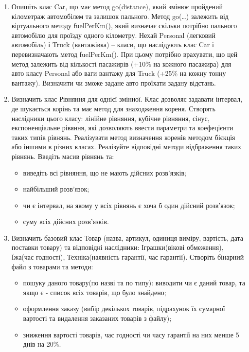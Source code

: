 \documentclass[a5paper,titlepage,openany,twoside,draft]{book_unv}%
\begin{document}
\begin{enumerate}
\item
  Опишіть клас Car, що має метод go(distance), який змінює пройдений
  кілометраж автомобілем та залишок пального. Метод go(\ldots{})
  залежить від віртуального методу fuelPerKm(), який визначає скільки
  потрібно пального автомобілю для проїзду одного кілометру. Нехай
  Personal (легковий автомобіль) і Truck (вантажівка) -- класи, що
  наслідують клас Car і перевизначають метод fuelPerKm(). При цьому
  потрібно врахувати, що цей метод залежить від кількості пасажирів
  (+10\% на кожного пасажира) для авто класу Personal або ваги вантажу
  для Truck (+25\% на кожну тонну вантажу). Визначити чи зможе задане
  авто проїхати задану відстань.

\item
Визначить клас Рівняння для однієї змінної. Клас дозволяє задавати інтервал,
де шукається корінь та має метод для знаходження кореня.
Створять наслідники цього класу: лінійне рівняння, кубічне рівняння, сінус,
експоненціальне рівяння, які дозволяють ввести параметри та коефецієнти таких типів
рівнянь. Реалізувати метод визначення коренів методом бієкція або іншими
в різних класах. Реалізуйте відповідні методи відбраження таких рівнянь.
Введіть масив рівнянь та:
\begin{itemize}
\item
виведіть всі рівняння, що не мають дійсних розв'язків;
\item
найбільший розв'язок;
\item
чи є інтервал, на якому у всіх рівнянь є хоча б один дійсний розв'язок;
\item
суму всіх дійсних розв'язків.
\end{itemize}

\item
Визначить базовий клас Товар 
(назва, артикул, одиниця виміру, вартість, дата поставки товару) та відповідні наслідники:
Іграшки(вікові обмеження), Їжа(час годності), Техніка(наявність гарантії, час гарантії).
Створіть бінарний файл з товарами та методи:
\begin{itemize}
\item
 пошуку даного товару(по назві та по типу): 
виводити чи є даний товар, та якщо є - 
список всіх товарів, що було знайдено; 
\item
оформлення заказу (вибір декількох товарів, 
підрахунок їх сумарної вартості та видалення
 заказаних товарів з файлу);
\item
зниження вартості товарів, час годності чи часу гарантії на них менше 5 днів на 20\%.
\end{itemize}


\end{enumerate}
\end{document}
